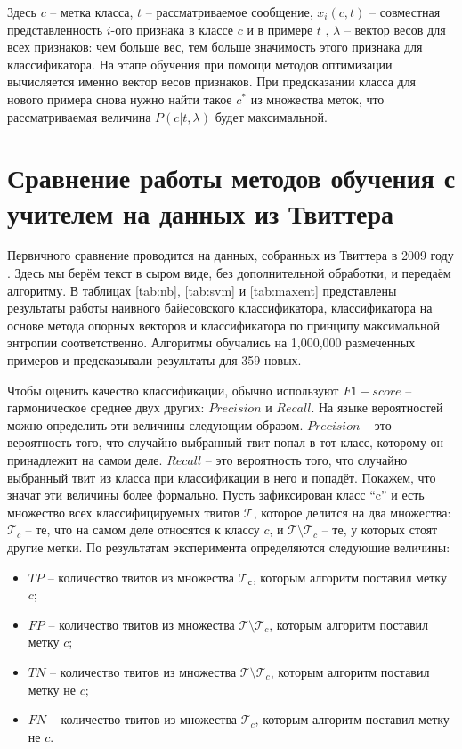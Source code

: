Здесь $c$ -- метка класса, $t$ -- рассматриваемое сообщение, $x_i(c,t)$ -- совместная
представленность $i$-ого признака в классе $c$ и в примере $t$ , $\lambda$ -- вектор весов для всех
признаков: чем больше вес, тем больше значимость этого признака для классификатора. На этапе обучения
при помощи методов оптимизации вычисляется именно вектор весов признаков. При предсказании класса
для нового примера снова нужно найти такое $c^*$ из множества меток, что рассматриваемая величина $P(c|t,\lambda)$ будет максимальной.

\section{Сравнение работы методов обучения с учителем на данных из Твиттера}

Первичного сравнение проводится на данных, собранных из Твиттера в 2009 году
\cite{go2009twitter}. Здесь мы берём текст в сыром виде, без дополнительной обработки, и передаём
алгоритму. В таблицах \ref{tab:nb}, \ref{tab:svm} и \ref{tab:maxent} представлены результаты работы
наивного байесовского классификатора, классификатора на основе метода опорных векторов и
классификатора по принципу максимальной энтропии соответственно. Алгоритмы обучались на 1,000,000
размеченных примеров и предсказывали результаты для 359 новых.

Чтобы оценить качество классификации, обычно используют $F1-score$ -- гармоническое среднее двух
других: $Precision$ и $Recall$. На языке вероятностей можно определить эти величины следующим образом. $Precision$ -- это
вероятность того, что случайно выбранный твит попал в тот класс, которому он принадлежит
на самом деле. $Recall$ -- это вероятность того, что случайно выбранный твит из класса
при классификации в него и попадёт. Покажем, что значат эти величины более формально.
Пусть зафиксирован класс ``c'' и есть множество всех классифицируемых твитов $\mathcal{T}$,
которое делится на два множества: $\mathcal{T}_c$ -- те, что на самом деле относятся к классу $c$,
и $\mathcal{T}\setminus\mathcal{T}_c$ -- те, у которых стоят другие метки.
По результатам эксперимента определяются следующие величины:
\begin{itemize}
  \item[ ] $TP$ -- количество твитов из множества $\mathcal{T}_с$, которым алгоритм поставил метку $c$;
  \item[ ] $FP$ -- количество твитов из множества $\mathcal{T}\setminus\mathcal{T}_c$, которым алгоритм поставил метку $c$;
  \item[ ] $TN$ -- количество твитов из множества $\mathcal{T}\setminus\mathcal{T}_c$, которым алгоритм поставил метку не $c$;
  \item[ ] $FN$ -- количество твитов из множества $\mathcal{T}_c$, которым алгоритм поставил метку не $c$.
\end{itemize}

